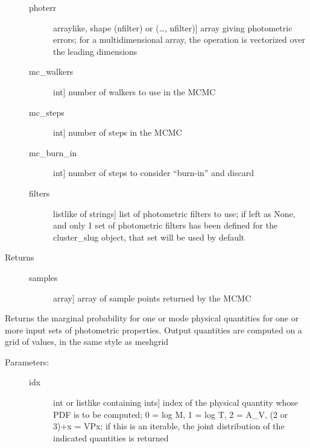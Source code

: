 \documentclass[letterpaper,10pt,english]{sphinxmanual}
\begin{document}
\begin{fulllineitems}
\begin{fulllineitems}
\begin{description}
\begin{description}
\item[{photerr}] \leavevmode{[}arraylike, shape (nfilter) or (…, nfilter){]}
array giving photometric errors; for a multidimensional
array, the operation is vectorized over the leading
dimensions

\item[{mc\_walkers}] \leavevmode{[}int{]}
number of walkers to use in the MCMC

\item[{mc\_steps}] \leavevmode{[}int{]}
number of steps in the MCMC

\item[{mc\_burn\_in}] \leavevmode{[}int{]}
number of steps to consider “burn-in” and discard

\item[{filters}] \leavevmode{[}listlike of strings{]}
list of photometric filters to use; if left as None, and
only 1 set of photometric filters has been defined for
the cluster\_slug object, that set will be used by
default

\end{description}

\item[{Returns}] \leavevmode\begin{description}
\item[{samples}] \leavevmode{[}array{]}
array of sample points returned by the MCMC

\end{description}

\end{description}

\end{fulllineitems}


\begin{fulllineitems}
\label{\detokenize{cluster_slug:slugpy.cluster_slug.cluster_slug.mpdf}}
Returns the marginal probability for one or mode physical
quantities for one or more input sets of photometric
properties. Output quantities are computed on a grid of
values, in the same style as meshgrid
\begin{description}
\item[{Parameters:}] \leavevmode\begin{description}
\item[{idx}] \leavevmode{[}int or listlike containing ints{]}
index of the physical quantity whose PDF is to be
computed; 0 = log M, 1 = log T, 2 = A\_V, (2 or 3)+x = VPx; 
if this is an iterable, the joint distribution of the indicated
quantities is returned


\end{description}
\end{description}
\end{fulllineitems}
\end{fulllineitems}
\end{document}
